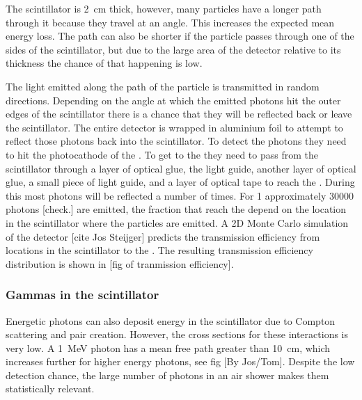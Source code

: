 The scintillator is \SI{2}{\centi\meter} thick, however, many particles have a longer path through it because they travel at an angle. This increases the expected mean energy loss. The path can also be shorter if the particle passes through one of the sides of the scintillator, but due to the large area of the detector relative to its thickness the chance of that happening is low.

The light emitted along the path of the particle is transmitted in random directions. Depending on the angle at which the emitted photons hit the outer edges of the scintillator there is a chance that they will be reflected back or leave the scintillator. The entire detector is wrapped in aluminium foil to attempt to reflect those photons back into the scintillator. To detect the photons they need to hit the photocathode of the \pmt. To get to the \pmt they need to pass from the scintillator through a layer of optical glue, the light guide, another layer of optical glue, a small piece of light guide, and a layer of optical tape to reach the \pmt. During this most photons will be reflected a number of times. For \SI{1}{\mip} approximately 30000 photons [check.] are emitted, the fraction that reach the \pmt depend on the location in the scintillator where the particles are emitted. A 2D Monte Carlo simulation of the detector [cite Jos Steijger] predicts the transmission efficiency from locations in the scintillator to the \pmt. The resulting transmission efficiency distribution is shown in [fig of tranmission efficiency].


\subsubsection{Gammas in the scintillator}

Energetic photons can also deposit energy in the scintillator due to Compton scattering and pair creation. However, the cross sections for these interactions is very low. A \SI{1}{\MeV} photon  has a mean free path greater than \SI{10}{\centi\meter}, which increases further for higher energy photons, see fig [By Jos/Tom]. Despite the low detection chance, the large number of photons in an air shower makes them statistically relevant.


\subsection{\pmt}

